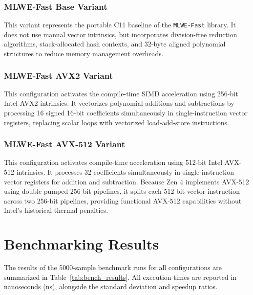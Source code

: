 \subsubsection{MLWE-Fast Base Variant}
This variant represents the portable C11 baseline of the \texttt{MLWE-}\allowbreak\texttt{Fast} library. It does not use manual vector intrinsics, but incorporates division-free reduction algorithms, stack-allocated hash contexts, and 32-byte aligned polynomial structures to reduce memory management overheads.

\subsubsection{MLWE-Fast AVX2 Variant}
This configuration activates the compile-time SIMD acceleration using 256-bit Intel AVX2 intrinsics. It vectorizes polynomial additions and subtractions by processing 16 signed 16-bit coefficients simultaneously in single-instruction vector registers, replacing scalar loops with vectorized load-add-store instructions.

\subsubsection{MLWE-Fast AVX-512 Variant}
This configuration activates compile-time acceleration using 512-bit Intel AVX-512 intrinsics. It processes 32 coefficients simultaneously in single-instruction vector registers for addition and subtraction. Because Zen 4 implements AVX-512 using double-pumped 256-bit pipelines, it splits each 512-bit vector instruction across two 256-bit pipelines, providing functional AVX-512 capabilities without Intel's historical thermal penalties.

\section{Benchmarking Results}
\label{sec:bench_results}

The results of the 5000-sample benchmark runs for all configurations are summarized in Table~\ref{tab:bench_results}. All execution times are reported in nanoseconds (ns), alongside the standard deviation and speedup ratios.

